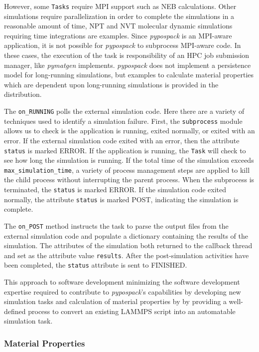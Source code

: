 However, some \verb|Tasks| require MPI support such as NEB calculations.  Other simulations require parallelization in order to complete the simulations in a reasonable amount of time,  NPT and NVT molecular dynamic simulations requiring time integrations are examples.
Since \emph{pypospack} is an MPI-aware application, it is not possible for \emph{pypospack} to subprocess MPI-aware code.  In these cases, the execution of the task is responsibility of an HPC job submission manager, like \emph{pymatgen} implements.  \emph{pypospack} does not implement a persistence model for long-running simulations, but examples to calculate material properties which are dependent upon long-running simulations is provided in the distribution.

The \verb|on_RUNNING| polls the external simulation code.  Here there are a variety of techniques used to identify a simulation failure.  First, the \verb|subprocess| module allows us to check is the application is running, exited normally, or exited with an error.  If the external simulation code exited with an error, then the attribute \verb|status| is marked ERROR.    If the application is running, the \verb|Task| will check to see how long the simulation is running. If the total time of the simulation exceeds \verb|max_simulation_time|, a variety of process management steps are applied to kill the child process without interrupting the parent process.  When the subprocess is terminated, the \verb|status| is marked ERROR.  If the simulation code exited normally, the attribute \verb|status| is marked POST, indicating the simulation is complete.

The \verb|on_POST| method instructs the task to parse the output files from the external simulation code and populate a dictionary containing the results of the simulation.  The attributes of the simulation both returned to the callback thread and set as the attribute value \verb|results|.  After the post-simulation activities have been completed, the \verb|status| attribute is sent to FINISHED.

This approach to software development minimizing the software development expertise required to contribute to \emph{pypospack}'s capabilities by developing new simulation tasks and calculation of material properties by by providing a well-defined process to convert an existing LAMMPS script into an automatable simulation task.

\subsubsection{Material Properties}


